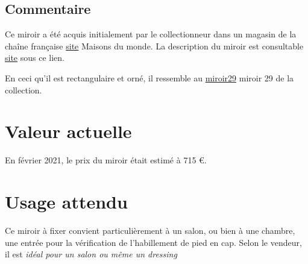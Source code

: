       \subsection* {Commentaire}
       
    
Ce miroir a été acquis initialement par le collectionneur dans un magasin de la
                chaîne française  
    \href{http://www.maisonsdumonde.com/}{site}
  Maisons du
                    monde. La description du miroir est consultable  
    \href{http://www.maisonsdumonde.com/FR/fr/p/miroir-trumeau-en-resine-ivoire-70x150-M21017760.htm}{site}
  sous ce lien. 
    
 
    
En ceci qu'il est rectangulaire et orné, il ressemble au 
    \href{miroir29.xml}{miroir29}
      miroir 29 de la collection. 
    

      \section* {Valeur actuelle} En février 2021, le prix du miroir était estimé à 715 €.
      \section* {Usage attendu}  
    
Ce miroir à fixer convient particulièrement à un salon, ou bien à une chambre, une entrée
            pour la vérification de l'habillement de pied en cap. Selon le vendeur, il est  
      {\em idéal pour un salon ou même un dressing }  
    

    
  